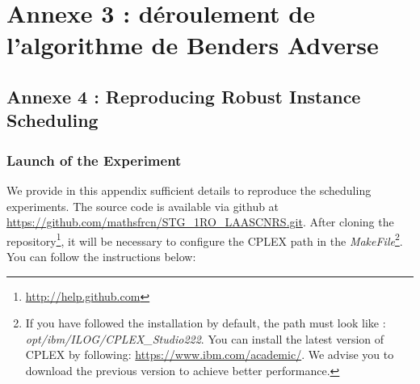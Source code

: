 \documentclass[12pt, a4paper, twoside]{article}
\numberwithin{equation}{section}
\begin{document}

    \clearpage
    \section{Annexe 3 : déroulement de l'algorithme de Benders Adverse}
    \label{sec:annexe:hand_instance}

    \begingroup
        \let\section\subsection
        \let\subsection\subsubsection
        \let\subsubsection\paragraph
        
    \endgroup


    \clearpage
	\section{Annexe 4 : Reproducing Robust Instance Scheduling}
	\label{section:annexe:notice}
    
	\subsection{Launch of the Experiment}

    \noindent We provide in this appendix sufficient details to reproduce the scheduling experiments. The source code is available via github at \href{https://github.com/mathsfrcn/STG_1RO_LAASCNRS.git}{https://github.com/mathsfrcn/STG\_1RO\_LAASCNRS.git}. After cloning the repository\footnote{\href{http://help.github.com}{http://help.github.com}}, it will be necessary to configure the CPLEX path in the \textit{MakeFile}\footnote{If you have followed the installation by default, the path must look like : \textit{opt/ibm/ILOG/CPLEX\_Studio222}. You can install the latest version of CPLEX by following: \href{https://www.ibm.com/academic/}{https://www.ibm.com/academic/}. We advise you to download the previous version to achieve better performance.}. You can follow the instructions below:
\end{document}
